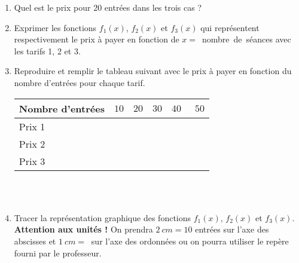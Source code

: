 \begin{enumerate}[1)~~~]
\item Quel est le prix pour 20 entrées dans les trois cas ?


\item Exprimer les fonctions $f_1(x)$, $f_2(x)$ et $f_3(x)$ qui représentent respectivement le prix à payer en fonction de \mbox{$x=$ \og nombre de séances\fg} avec les tarifs 1, 2 et 3.

%
%


\item Reproduire et remplir le tableau suivant avec le prix à payer en fonction du nombre d'entrées pour chaque tarif.
	\begin{center}
		\begin{tabular}{|>{\centering}m{100pt}|>{\centering}m{30pt}|>{\centering}m{30pt}|>{\centering}m{30pt}|>{\centering}m{30pt}|m{30pt}|}
		\hline 
		Nombre d'entrées & $10$ & $20$ & $30$ & $40$ & $~~50$ \\
		\hline
		Prix 1 	&  &   &   &   &	\\ 
		\hline 
		Prix 2 	&  &   &   &   &	\\ 
		\hline 
		Prix 3 	&  &   &   &   &	\\ 
		\hline 
		\end{tabular}~\\~\\
	\end{center}
	

\item Tracer la représentation graphique des fonctions $f_1(x)$, $f_2(x)$ et $f_3(x)$. \textbf{Attention aux unités !} On prendra $2~cm=10$ entrées sur l'axe des abscisses et $1~cm=~$ sur l'axe des ordonnées ou on pourra utiliser le repère fourni par le professeur.	


\end{enumerate}
